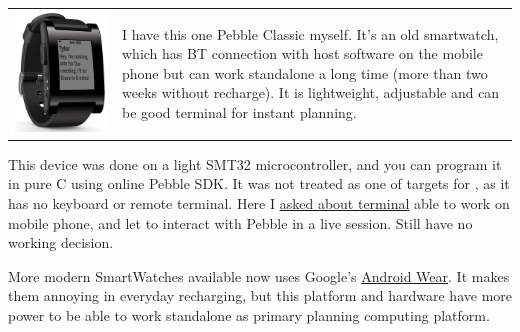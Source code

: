 \noindent
\begin{tabular}{l p{}}
\includegraphics[height=0.45\textheight,valign=t]{img/pebble_classic.png}
&
I have this one Pebble Classic myself. It's an old smartwatch, which has BT
connection with host software on the mobile phone but can work standalone a long
time (more than two weeks without recharge). It is lightweight, adjustable and
can be good terminal for instant planning.
\\
\end{tabular}
This device was done on a light SMT32 microcontroller, and you can program it in
pure C using online Pebble SDK. It was not treated as one of targets for \uF, as
it has no keyboard or remote terminal. Here I
\href{https://www.quora.com/unanswered/How-can-I-write-remote-terminal-Android-for-Pebble-Classic-Smartwatch-to-be-able-to-reprogram-it-interactively-I-think-about-full-watch-hosted-Forth-port-or-tiny-bytecode-interpreter-and-compiler-embedded-into-the}{asked
about terminal} able to work on mobile phone, and let to interact with Pebble in
a live session. Still have no working decision.

\bigskip
More modern SmartWatches available now uses Google's
\href{https://www.android.com/wear/}{Android Wear}. It makes them annoying in
everyday recharging, but this platform and hardware have more power to be able
to work standalone as primary planning computing platform.
